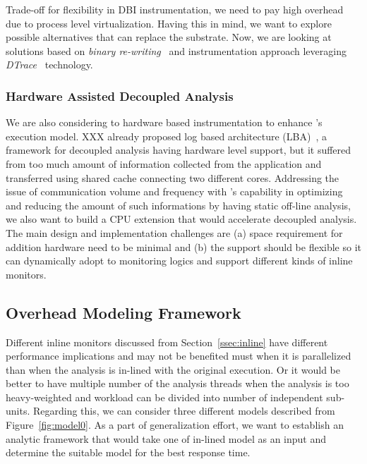 Trade-off for flexibility in DBI instrumentation, we need to pay high
overhead due to process level virtualization. Having this in mind, we want to
explore possible alternatives that can replace the substrate. Now, we are
looking at solutions based on {\it binary re-writing}~\cite{cfi,
brewriting:usenix2003} and instrumentation approach leveraging {\it
DTrace}~\cite{DTrace} technology.

\subsubsection{Hardware Assisted Decoupled Analysis} 
\label{}

We are also considering to hardware based instrumentation to enhance
\sreplica's execution model. XXX \etal already proposed log based architecture
(LBA)~\cite{lba:isca2008}, a framework for decoupled analysis having hardware level
support, but it suffered from too much amount of information collected from the
application and transferred using shared cache connecting two different cores.
%
Addressing the issue of communication volume and frequency with \sreplica's
capability in optimizing and reducing the amount of such informations by having
static off-line analysis, we also want to build a CPU extension that would
accelerate decoupled analysis. 
%
The main design and implementation challenges are (a) space requirement for
addition hardware need to be minimal and (b) the support should be flexible so
it can dynamically adopt to monitoring logics and support different kinds of
inline monitors.

\subsection{Overhead Modeling Framework}

Different inline monitors discussed from Section~\ref{ssec:inline} have
different performance implications and may not be benefited must when it is
parallelized than when the analysis is in-lined with the original execution. Or
it would be better to have multiple number of the analysis threads when the
analysis is too heavy-weighted and workload can be divided into number of
independent sub-units. Regarding this, we can consider three different models
described from Figure~\ref{fig:model0}. As a part of generalization effort, we
want to establish an analytic framework that would take one of in-lined model
as an input and determine the suitable model for the best response time. 

